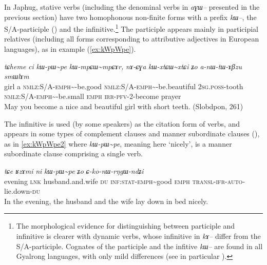\documentclass[oldfontcommands,oneside,a4paper,11pt]{article}
\newcommand{\ipa}[1]{{\phon\textit{#1}}} %
\newcommand{\tld}{\textasciitilde{}}
\begin{document}
In Japhug, stative verbs (including the denominal verbs in \ipa{aɣɯ--} presented in the previous section) have two homophonous non-finite forms with a prefix \ipa{kɯ--}, the S/A-participle (\citealt[5]{jacques14antipassive}) and the infinitive.\footnote{The morphological evidence for distinguishing between participle and infinitive is clearer with dynamic verbs, whose infinitive in \ipa{kɤ--} differ from the S/A-participle. Cognates of the participle and the infitive \ipa{kɯ--} are found in all Gyalrong languages, with only mild differences (see in particular \citealt{sun14generic}).} The participle appears mainly in participial relatives (including all forms corresponding to attributive adjectives in European languages), as in example (\ref{ex:kWpWpe}).

\begin{exe}
\ex \label{ex:kWpWpe}
\gll
\ipa{tɕheme} 	\ipa{ci} 	\ipa{kɯ-pɯ\tld{}pe} 	\ipa{kɯ-mpɕɯ\tld{}mpɕɤr,} 	\ipa{nɤ-ɕɣa} 	\ipa{kɯ-xtɕɯ\tld{}xtɕi} 	\ipa{ʑo} 	\ipa{a-nɯ-tɯ-ɤβzu} 	\ipa{smɯlɤm}  \\
girl a \textsc{nmlz:S/A-emph}\tld{}-be.good \textsc{nmlz:S/A-emph}\tld{}-be.beautiful  \textsc{2sg.poss}-tooth \textsc{nmlz:S/A-emph}\tld{}-be.small \textsc{emph} \textsc{irr-pfv}-2-become prayer \\
\glt May you become a nice and beautiful girl with short teeth. (Slobdpon, 261)
\end{exe}

The infinitive is used (by some speakers) as the citation form of verbs, and appears in some types of complement clauses and manner subordinate clauses (\citealt[271-2; 321-5]{jacques14linking}), as in \ref{ex:kWpWpe2} where \ipa{kɯ-pɯ\tld{}pe}, meaning here `nicely', is a manner subordinate clause comprising a single verb.
 \begin{exe}
\ex \label{ex:kWpWpe2}
\gll \ipa{ɕɤr} 	\ipa{tɕe} 	\ipa{ʁzɤmi} 	\ipa{ni} 	\ipa{kɯ-pɯ\tld{}pe} 	\ipa{ʑo} 	\ipa{ɕ-ko-nɯ-rŋgɯ-ndʑi}  \\
evening \textsc{lnk} husband.and.wife \textsc{du} \textsc{inf:stat-emph}\tld{}good \textsc{emph} \textsc{transl-ifr-auto}-lie.down-\textsc{du} \\
\glt In the evening, the husband and the wife lay down in bed nicely.
\end{exe}

\end{document}
